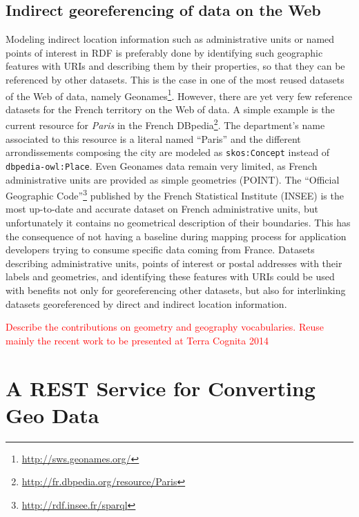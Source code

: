 \subsection{Indirect georeferencing of data on the Web}
\label{sec:indirectgeo}
Modeling indirect location information such as administrative units or named points of interest in RDF is preferably done by identifying such geographic features with URIs and describing them by their properties, so that they can be referenced by other datasets. This is the case in one of the most reused datasets of the Web of data, namely Geonames\footnote{\url{http://sws.geonames.org/}}. However, there are yet very few reference datasets for the French territory on the Web of data.  A simple example is the current resource for \textit{Paris} in the French DBpedia\footnote{\url{http://fr.dbpedia.org/resource/Paris}}. The department's name associated to this resource is a literal named ``Paris'' and the different arrondissements composing the city are modeled as \texttt{skos:Concept} instead of \texttt{dbpedia-owl:Place}. Even Geonames data remain very limited, as French administrative units are provided as simple geometries (POINT). The ``Official Geographic Code''\footnote{\url{http://rdf.insee.fr/sparql}} published by the French Statistical Institute (INSEE) is the most up-to-date and accurate dataset on French administrative units, but unfortunately it contains no geometrical description of their boundaries. This has the consequence of not having a baseline during mapping process for application developers trying to consume specific data coming from France. Datasets describing administrative units, points of interest or postal addresses with their labels and geometries, and identifying these features with URIs could be used with benefits not only for georeferencing other datasets, but also for interlinking datasets georeferenced by direct and indirect location information.

\textcolor{red}{Describe the contributions on geometry and geography vocabularies. Reuse mainly the recent work to be presented at Terra Cognita 2014}


\section{A REST Service for Converting Geo Data}
\label{sec:rest-service}

